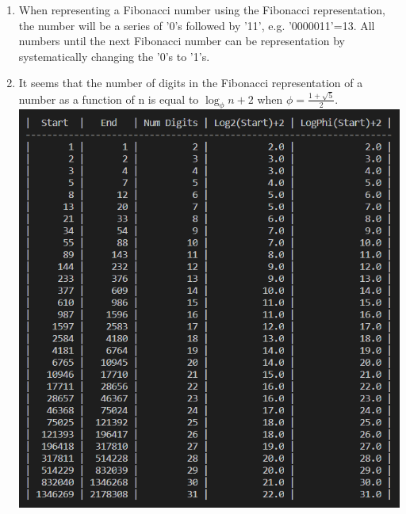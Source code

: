 \documentclass[a4paper]{article}
\begin{document}
    \begin{enumerate}[label=\alph*)]
    
        \item When representing a Fibonacci number using the Fibonacci representation, the number will 
        be a series of '0's followed by '11', e.g. '0000011'=13. All numbers until the next Fibonacci
        number can be representation by systematically changing the '0's to '1's.

    
        \item It seems that the number of digits in the Fibonacci representation of a number as a
        function of n is equal to $\log_\phi n + 2$ when $\phi = \frac{1+\sqrt{5}}{2}$. \\
        \includegraphics[scale=0.7]{6b2}\\

\end{enumerate}
\end{document}
